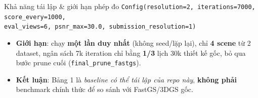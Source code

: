 \begin{frame}{Khả năng tái lập \& giới hạn phép đo}
\footnotesize
\texttt{Config(resolution=2, iterations=7000, score\_every=1000,\\
\hspace{2em}eval\_views=6, psnr\_max=30.0, submission\_resolution=1)}
\normalsize
\vspace{0.5em}
\begin{itemize}
    \item \textbf{Giới hạn}: chạy \textbf{một lần duy nhất} (không seed/lặp lại), chỉ \textbf{4 scene} từ 2 dataset, ngân sách 7k iteration chỉ bằng \textbf{1/3} lịch 30k thiết kế gốc, bỏ qua bước prune cuối (\texttt{final\_prune\_fastgs}).
    \item[$\Rightarrow$] \textbf{Kết luận}: Bảng 1 là \emph{baseline có thể tái lập của repo này}, \textbf{không phải} benchmark chính thức để so sánh với FastGS/3DGS gốc.
\end{itemize}
\end{frame}
